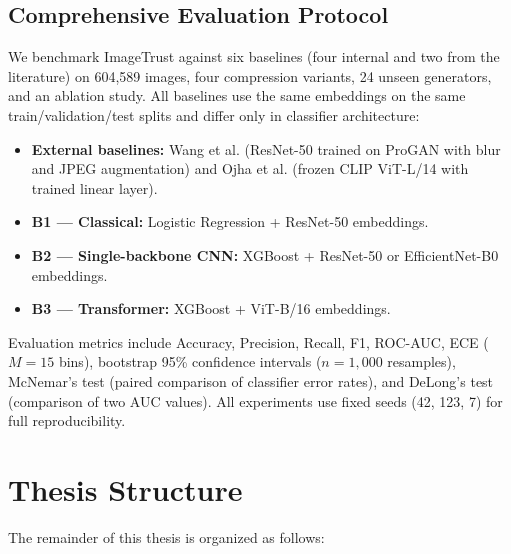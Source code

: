 \subsection{Comprehensive Evaluation Protocol}\label{sec:contrib-evaluation}

We benchmark ImageTrust against six baselines (four internal and two from the literature) on 604,589 images, four compression variants, 24 unseen generators, and an ablation study. All baselines use the same embeddings on the same train/validation/test splits and differ only in classifier architecture:

\begin{itemize}
    \item \textbf{External baselines:} Wang et al. \cite{wang2020cnn} (ResNet-50 trained on ProGAN with blur and JPEG augmentation) and Ojha et al. \cite{ojha2023towards} (frozen CLIP ViT-L/14 with trained linear layer).
    \item \textbf{B1 --- Classical:} Logistic Regression + ResNet-50 embeddings.
    \item \textbf{B2 --- Single-backbone CNN:} XGBoost + ResNet-50 or EfficientNet-B0 embeddings.
    \item \textbf{B3 --- Transformer:} XGBoost + ViT-B/16 embeddings.
\end{itemize}

Evaluation metrics include Accuracy, Precision, Recall, F1, ROC-AUC, ECE ($M{=}15$ bins), bootstrap 95\% confidence intervals ($n{=}1{,}000$ resamples), McNemar's test (paired comparison of classifier error rates), and DeLong's test (comparison of two AUC values). All experiments use fixed seeds (42, 123, 7) for full reproducibility.


\section{Thesis Structure}\label{sec:structure}

The remainder of this thesis is organized as follows:

